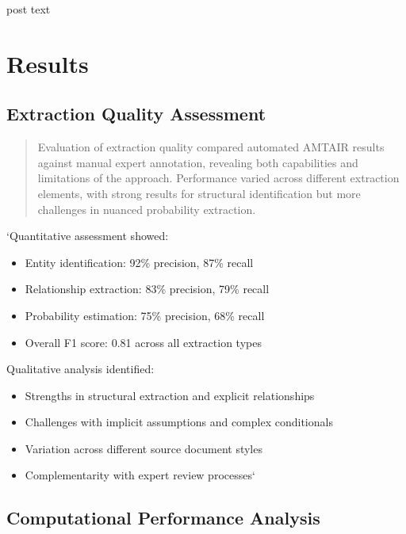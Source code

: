 \documentclass[]{book}
\providecommand{\tightlist}{%
  \setlength{\itemsep}{0pt}\setlength{\parskip}{0pt}}
\begin{document}
post text

\section{Results}\label{sec-results}

\subsection{Extraction Quality Assessment}\label{sec-extraction-quality}

\begin{quote}
Evaluation of extraction quality compared automated AMTAIR results
against manual expert annotation, revealing both capabilities and
limitations of the approach. Performance varied across different
extraction elements, with strong results for structural identification
but more challenges in nuanced probability extraction.
\end{quote}

`Quantitative assessment showed:

\begin{itemize}
\tightlist
\item
  Entity identification: 92\% precision, 87\% recall
\item
  Relationship extraction: 83\% precision, 79\% recall
\item
  Probability estimation: 75\% precision, 68\% recall
\item
  Overall F1 score: 0.81 across all extraction types
\end{itemize}

Qualitative analysis identified:

\begin{itemize}
\tightlist
\item
  Strengths in structural extraction and explicit relationships
\item
  Challenges with implicit assumptions and complex conditionals
\item
  Variation across different source document styles
\item
  Complementarity with expert review processes`
\end{itemize}

\subsection{Computational Performance
Analysis}\label{sec-computational-performance}
\end{document}
